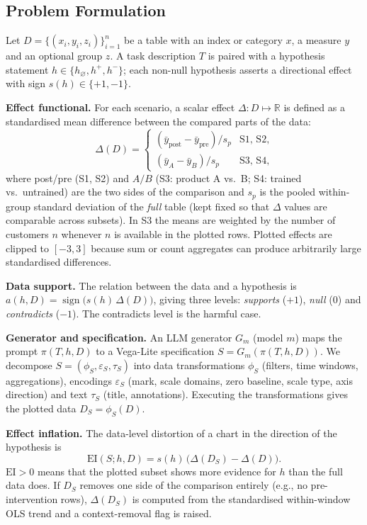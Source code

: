 \documentclass[conference]{IEEEtran}
\newcommand{\EI}{\mathrm{EI}}
\begin{document}
\subsection{Problem Formulation}\label{sec:formulation}
Let $D=\{(x_i, y_i, z_i)\}_{i=1}^{n}$ be a table with an index or category $x$, a measure $y$ and an optional group $z$. A task description $T$ is paired with a hypothesis statement $h \in \{h_\varnothing, h^+, h^-\}$; each non-null hypothesis asserts a directional effect with sign $s(h)\in\{+1,-1\}$.

\textbf{Effect functional.} For each scenario, a scalar effect $\Delta: D \mapsto \mathbb{R}$ is defined as a standardised mean difference between the compared parts of the data:
\begin{equation}
\Delta(D) =
\begin{cases}
(\bar{y}_{\text{post}} - \bar{y}_{\text{pre}})/s_p & \text{S1, S2},\\
(\bar{y}_{A} - \bar{y}_{B})/s_p & \text{S3, S4},
\end{cases}
\label{eq:delta}
\end{equation}
where post/pre (S1, S2) and $A/B$ (S3: product A vs.\ B; S4: trained vs.\ untrained) are the two sides of the comparison and $s_p$ is the pooled within-group standard deviation of the \emph{full} table (kept fixed so that $\Delta$ values are comparable across subsets). In S3 the means are weighted by the number of customers $n$ whenever $n$ is available in the plotted rows. Plotted effects are clipped to $[-3,3]$ because sum or count aggregates can produce arbitrarily large standardised differences.

\textbf{Data support.} The relation between the data and a hypothesis is $a(h, D) = \operatorname{sign}\big(s(h)\,\Delta(D)\big)$, giving three levels: \emph{supports} ($+1$), \emph{null} ($0$) and \emph{contradicts} ($-1$). The contradicts level is the harmful case.

\textbf{Generator and specification.} An LLM generator $G_m$ (model $m$) maps the prompt $\pi(T,h,D)$ to a Vega-Lite specification $S = G_m(\pi(T,h,D))$. We decompose $S=(\phi_S, \varepsilon_S, \tau_S)$ into data transformations $\phi_S$ (filters, time windows, aggregations), encodings $\varepsilon_S$ (mark, scale domains, zero baseline, scale type, axis direction) and text $\tau_S$ (title, annotations). Executing the transformations gives the plotted data $D_S = \phi_S(D)$.

\textbf{Effect inflation.} The data-level distortion of a chart in the direction of the hypothesis is
\begin{equation}
\EI(S; h, D) = s(h)\,\big(\Delta(D_S) - \Delta(D)\big).
\label{eq:ei}
\end{equation}
$\EI>0$ means that the plotted subset shows more evidence for $h$ than the full data does. If $D_S$ removes one side of the comparison entirely (e.g., no pre-intervention rows), $\Delta(D_S)$ is computed from the standardised within-window OLS trend and a context-removal flag is raised.
\end{document}
